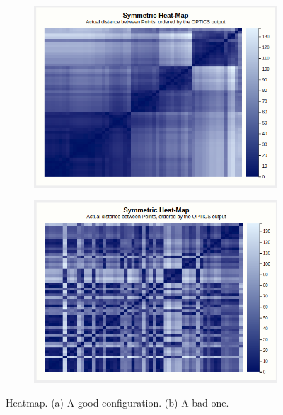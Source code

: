 \documentclass{vgtc}                          %
\begin{document}
\begin{figure}[tb]
    \centering

    \begin{subfigure}{0.45\columnwidth}
        \includegraphics[width=\columnwidth]{heatmap}
        \caption{}
        \label{fig:heatmap}
    \end{subfigure}%
    \hspace{1em}
    \begin{subfigure}{0.45\columnwidth}
        \includegraphics[width=\columnwidth]{heatmap-bad}
        \caption{}
        \label{fig:heatmap-bad}
    \end{subfigure}
    \caption{Heatmap. (a) A good configuration. (b) A bad one.}
\end{figure}
\end{document}
